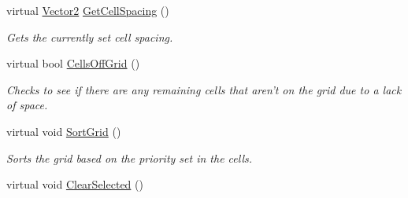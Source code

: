 \begin{DoxyCompactItemize}
virtual \hyperlink{classphys_1_1Vector2}{Vector2} \hyperlink{classphys_1_1UI_1_1CellGrid_a232260f23808cd7099f2f9a15850a14e}{GetCellSpacing} ()
\begin{DoxyCompactList}\small\item\em Gets the currently set cell spacing. \item\end{DoxyCompactList}\item 
virtual bool \hyperlink{classphys_1_1UI_1_1CellGrid_ae901b18d90b8ed0d16da25ccfa91e84e}{CellsOffGrid} ()
\begin{DoxyCompactList}\small\item\em Checks to see if there are any remaining cells that aren't on the grid due to a lack of space. \item\end{DoxyCompactList}\item 
\hypertarget{classphys_1_1UI_1_1CellGrid_ae539f6b21c3ed84852df37153ae2aebf}{
virtual void \hyperlink{classphys_1_1UI_1_1CellGrid_ae539f6b21c3ed84852df37153ae2aebf}{SortGrid} ()}
\label{d8/d59/classphys_1_1UI_1_1CellGrid_ae539f6b21c3ed84852df37153ae2aebf}

\begin{DoxyCompactList}\small\item\em Sorts the grid based on the priority set in the cells. \item\end{DoxyCompactList}\item 
\hypertarget{classphys_1_1UI_1_1CellGrid_ae2ad049f3e426c8a26cca6c59fb853aa}{
virtual void \hyperlink{classphys_1_1UI_1_1CellGrid_ae2ad049f3e426c8a26cca6c59fb853aa}{ClearSelected} ()}
\label{d8/d59/classphys_1_1UI_1_1CellGrid_ae2ad049f3e426c8a26cca6c59fb853aa}


\end{DoxyCompactItemize}
